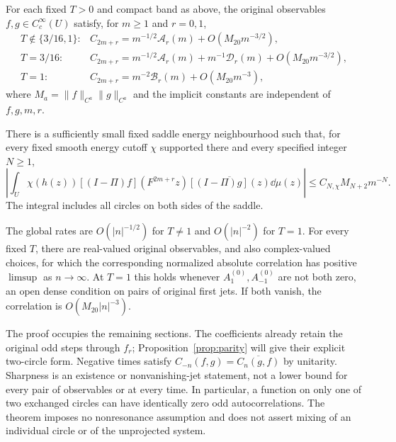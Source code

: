 \begin{theorem}\label{thm:main}
For each fixed $T>0$ and compact band as above, the original
observables $f,g\in C_c^\infty(U)$ satisfy, for $m\ge1$ and
$r=0,1$,
\begin{equation}
\begin{array}{ll}
 T\notin\{3/16,1\}:&
 C_{2m+r}=m^{-1/2}\mathcal A_r(m)+O(M_{20}m^{-3/2}),\\[1mm]
 T=3/16:&
 C_{2m+r}=m^{-1/2}\mathcal A_r(m)+m^{-1}\mathcal D_r(m)
                    +O(M_{20}m^{-3/2}),\\[1mm]
 T=1:&
 C_{2m+r}=m^{-2}\mathcal B_r(m)+O(M_{20}m^{-3}),
\end{array}
\label{eq:main-asymptotics}
\end{equation}
where $M_a=\|f\|_{C^a}\|g\|_{C^a}$ and the implicit constants
are independent of $f,g,m,r$.

There is a sufficiently small fixed saddle energy neighbourhood
such that, for every fixed smooth energy cutoff $\chi$ supported
there and every specified integer $N\ge1$,
\[
 \left|\int_U\chi(h(z))[(I-\Pi)f](F^{2m+r}z)
                  \overline{[(I-\Pi)g](z)}\dd\mu(z)\right|
 \le C_{N,\chi} M_{N+2}m^{-N}.
\]
The integral includes all circles on both sides of the saddle.

The global rates are $O(|n|^{-1/2})$ for $T\ne1$ and
$O(|n|^{-2})$ for $T=1$. For every fixed $T$, there are real-valued
original observables, and also complex-valued choices, for which
the corresponding normalized absolute correlation has positive
$\limsup$ as $n\to\infty$. At $T=1$ this holds whenever
$A_1^{(0)},A_{-1}^{(0)}$ are not both zero, an open dense condition
on pairs of original first jets. If both vanish, the correlation
is $O(M_{20}|n|^{-3})$.
\end{theorem}

The proof occupies the remaining sections. The coefficients already
retain the original odd steps through $f_r$; Proposition~\ref{prop:parity}
will give their explicit two-circle form. Negative times satisfy
$C_{-n}(f,g)=\overline{C_n(g,f)}$ by unitarity. Sharpness is an
existence or nonvanishing-jet statement, not a lower bound for every
pair of observables or at every time. In particular, a function on
only one of two exchanged circles can have identically zero odd
autocorrelations. The theorem imposes no nonresonance assumption and
does not assert mixing of an individual circle or of the unprojected
system.
